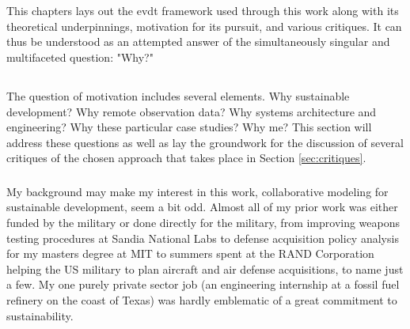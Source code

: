 \chapter{} \label{ch:theory}

This chapters lays out the \ac{evdt} framework used through this work along with its theoretical underpinnings, motivation for its pursuit, and various critiques. It can thus be understood as an attempted answer of the simultaneously singular and multifaceted question: "Why?"

\section{}

The question of motivation includes several elements. Why sustainable development? Why remote observation data? Why systems architecture and engineering? Why these particular case studies? Why me? This section will address these questions as well as lay the groundwork for the discussion of several critiques of the chosen approach that takes place in Section \ref{sec:critiques}.

\subsection{}

My background may make my interest in this work, collaborative modeling for sustainable development, seem a bit odd. Almost all of my prior work was either funded by the military or done directly for the military, from improving weapons testing procedures at Sandia National Labs to defense acquisition policy analysis for my masters degree at MIT to summers spent at the RAND Corporation helping the US military to plan aircraft and air defense acquisitions, to name just a few. My one purely private sector job (an engineering internship at a fossil fuel refinery on the coast of Texas) was hardly emblematic of a great commitment to sustainability.

